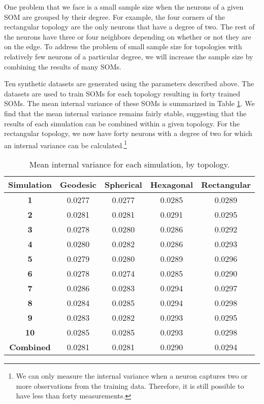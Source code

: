 One problem that we face is a small sample size when the neurons of a given
SOM are grouped by their degree.  For example, the four corners of the
rectangular topology are the only neurons that have a degree of two.  The rest
of the neurons have three or four neighbors depending on whether or not they
are on the edge. To address the problem of small sample size for topologies
with relatively few neurons of a particular degree, we will increase
the sample size by combining the results of many SOMs.

Ten synthetic datasets are generated using the parameters described above.
The datasets are used to train SOMs for each topology resulting in forty
trained SOMs. The mean internal variance of these SOMs is summarized in Table
\ref{ivtable3}.  We find that the mean internal variance remains fairly
stable, suggesting that the results of each simulation can be combined within
a given topology.  For the rectangular topology, we now have forty neurons
with a degree of two for which an internal variance can be
calculated.\footnote{We can only measure the internal variance when a neuron
captures two or more observations from the training data.  Therefore, it is
still possible to have less than forty measurements.}

\begin{table}[hbt]
\centering
\caption{Mean internal variance for each simulation, by topology.}
\label{ivtable3}
\begin{tabular}{|c||c|c|c|c|}
\hline
\textbf{Simulation} & Geodesic & Spherical & Hexagonal & Rectangular \\
\hline
\hline
\textbf{1} & 0.0277 & 0.0277 & 0.0285 & 0.0289 \\
\textbf{2} & 0.0281 & 0.0281 & 0.0291 & 0.0295 \\
\textbf{3} & 0.0278 & 0.0280 & 0.0286 & 0.0292 \\
\textbf{4} & 0.0280 & 0.0282 & 0.0286 & 0.0293 \\
\textbf{5} & 0.0279 & 0.0280 & 0.0289 & 0.0296 \\
\textbf{6} & 0.0278 & 0.0274 & 0.0285 & 0.0290 \\
\textbf{7} & 0.0286 & 0.0283 & 0.0294 & 0.0297 \\
\textbf{8} & 0.0284 & 0.0285 & 0.0294 & 0.0298 \\
\textbf{9} & 0.0283 & 0.0282 & 0.0293 & 0.0295 \\
\textbf{10}& 0.0285 & 0.0285 & 0.0293 & 0.0298 \\
\hline
\hline
\textbf{Combined} & 0.0281 & 0.0281 & 0.0290 & 0.0294\\
\hline
\end{tabular} \end{table}


